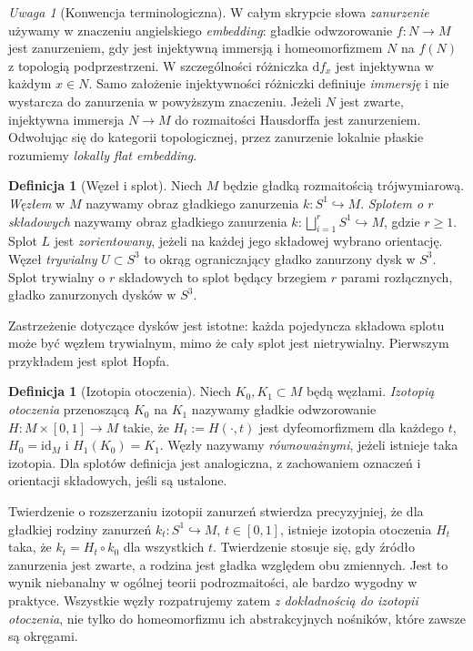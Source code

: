 \documentclass[11pt,a4paper]{report}
\numberwithin{equation}{section}
\theoremstyle{plain}
\theoremstyle{definition}
\newtheorem{definicja}[twierdzenie]{Definicja}
\theoremstyle{remark}
\newtheorem{uwaga}[twierdzenie]{Uwaga}
\begin{document}
\begin{uwaga}[Konwencja terminologiczna]
W całym skrypcie słowa \emph{zanurzenie} używamy w znaczeniu
angielskiego \emph{embedding}: gładkie odwzorowanie
$f\colon N\to M$ jest zanurzeniem, gdy jest injektywną immersją
i homeomorfizmem $N$ na $f(N)$ z topologią podprzestrzeni.
W szczególności różniczka $\mathrm df_x$ jest injektywna w każdym
$x\in N$. Samo założenie injektywności różniczki definiuje
\emph{immersję} i nie wystarcza do zanurzenia w powyższym
znaczeniu. Jeżeli $N$ jest zwarte, injektywna immersja
$N\to M$ do rozmaitości Hausdorffa jest zanurzeniem.
Odwołując się do kategorii topologicznej, przez zanurzenie
lokalnie płaskie rozumiemy \emph{lokally flat embedding}.
\end{uwaga}


\begin{definicja}[Węzeł i splot]
Niech $M$ będzie gładką rozmaitością trójwymiarową.
\emph{Węzłem} w $M$ nazywamy obraz gładkiego zanurzenia
$k\colon S^1\hookrightarrow M$.
\emph{Splotem o $r$ składowych} nazywamy obraz gładkiego zanurzenia
$k\colon\bigsqcup_{i=1}^{r}S^1\hookrightarrow M$, gdzie $r\geq1$.
Splot $L$ jest \emph{zorientowany}, jeżeli na każdej jego składowej
wybrano orientację. Węzeł \emph{trywialny} $U\subset S^3$ to okrąg
ograniczający gładko zanurzony dysk w $S^3$. Splot trywialny o $r$
składowych to splot będący brzegiem $r$ parami rozłącznych,
gładko zanurzonych dysków w $S^3$.
\end{definicja}

Zastrzeżenie dotyczące dysków jest istotne: każda pojedyncza składowa
splotu może być węzłem trywialnym, mimo że cały splot jest
nietrywialny. Pierwszym przykładem jest splot Hopfa.

\begin{definicja}[Izotopia otoczenia]
Niech $K_0,K_1\subset M$ będą węzłami. \emph{Izotopią otoczenia}
przenoszącą $K_0$ na $K_1$ nazywamy gładkie odwzorowanie
$H\colon M\times[0,1]\to M$ takie, że $H_t:=H(\cdot,t)$
jest dyfeomorfizmem dla każdego $t$, $H_0=\mathrm{id}_M$ i
$H_1(K_0)=K_1$. Węzły nazywamy \emph{równoważnymi}, jeżeli
istnieje taka izotopia. Dla splotów definicja jest analogiczna,
z zachowaniem oznaczeń i orientacji składowych, jeśli są ustalone.
\end{definicja}

Twierdzenie o rozszerzaniu izotopii zanurzeń stwierdza precyzyjniej,
że dla gładkiej rodziny zanurzeń $k_t\colon S^1\hookrightarrow M$,
$t\in[0,1]$, istnieje izotopia otoczenia $H_t$ taka, że
$k_t=H_t\circ k_0$ dla wszystkich $t$. Twierdzenie stosuje się,
gdy źródło zanurzenia jest zwarte, a rodzina jest gładka względem
obu zmiennych. Jest to wynik niebanalny w ogólnej teorii podrozmaitości,
ale bardzo wygodny w praktyce. Wszystkie węzły rozpatrujemy zatem
\emph{z dokładnością do izotopii otoczenia}, nie tylko do homeomorfizmu
ich abstrakcyjnych nośników, które zawsze są okręgami.
\end{document}
